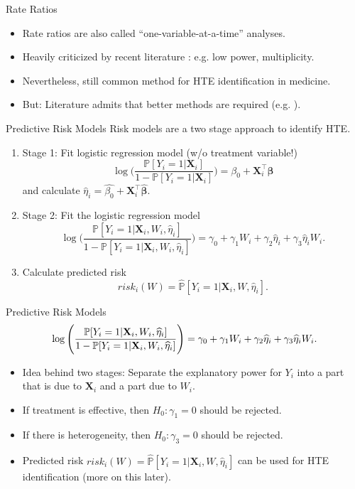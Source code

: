 \documentclass[11pt]{beamer}
\newcommand{\X}{\mathbf{X}}
\renewcommand{\P}{\mathbb{P}}
\begin{document}
\begin{frame}{Rate Ratios}
\begin{itemize}\setlength\itemsep{1em}
	\item Rate ratios are also called ``one-variable-at-a-time'' analyses.
	\item Heavily criticized by recent literature \citep{kent2020path}: e.g. low power, multiplicity.
	\item Nevertheless, still common method for HTE identification in medicine.
	\item But: Literature admits that better methods are required (e.g. \citealp{kent2020path}).
\end{itemize}
\end{frame}


\begin{frame}{Predictive Risk Models}
Risk models \citep{kent2020path} are a two stage approach to identify HTE.
\begin{enumerate}
	\item Stage 1: Fit logistic regression model (w/o treatment variable!)
	\[
	\log \Bigg( \frac{\P[Y_i = 1 | \X_i]}{1 - \P[Y_i = 1 | \X_i]} \Bigg)
	=
	\beta_0 + \X_i^\top \bm{\beta}
	\]
	and calculate $\widehat{\eta}_i = \widehat{\beta_0} + \X_i^\top \widehat{\bm{\beta}}$.
	\item Stage 2: Fit the logistic regression model
	\[
	\log \Bigg( \frac{\P[Y_i = 1 | \X_i, W_i, \widehat{\eta}_i]}{1 - \P[Y_i = 1 | \X_i, W_i, \widehat{\eta}_i]} \Bigg)
	=
	\gamma_0 + \gamma_1 W_i + \gamma_2 \widehat{\eta}_i + \gamma_3 \widehat{\eta}_i W_i.
	\]
	\item Calculate predicted risk \[risk_i(W) = \widehat{\P}[Y_i = 1 | \X_i, W, \widehat{\eta}_i].\]
\end{enumerate}
\end{frame}


\begin{frame}{Predictive Risk Models}
\[
	\log \Bigg( \frac{\P[Y_i = 1 | \X_i, W_i, \widehat{\eta}_i]}{1 - \P[Y_i = 1 | \X_i, W_i, \widehat{\eta}_i]} \Bigg)
	=
	\gamma_0 + \gamma_1 W_i + \gamma_2 \widehat{\eta}_i + \gamma_3 \widehat{\eta}_i W_i.\bigskip
	\]
\begin{itemize}\setlength\itemsep{1em}
	\item Idea behind two stages: Separate the explanatory power for $Y_i$ into a part that is due to $\X_i$ and a part due to $W_i$.
	\item If treatment is effective, then $H_0: \gamma_1 = 0$ should be rejected.
	\item If there is heterogeneity, then $H_0: \gamma_3 = 0$ should be rejected.
	\item Predicted risk $risk_i(W) = \widehat{\P}[Y_i = 1 | \X_i, W, \widehat{\eta}_i]$ can be used for HTE identification (more on this later).
\end{itemize}
\end{frame}
\end{document}
